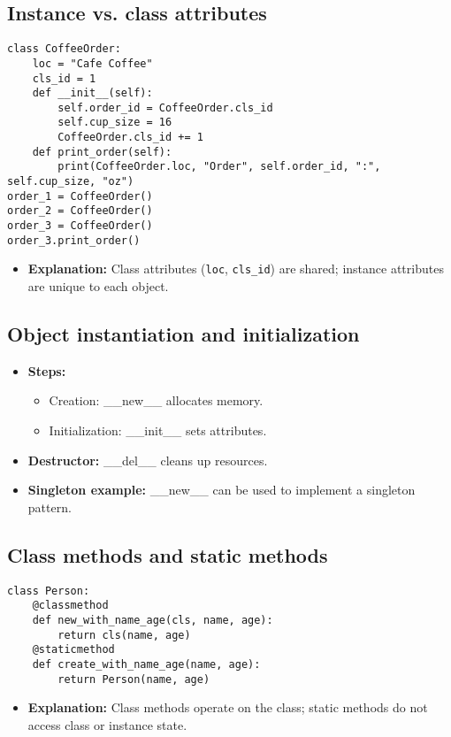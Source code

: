 \documentclass[11pt,a4paper]{article}
\begin{document}
\subsection*{Instance vs. class attributes}
\begin{verbatim}
class CoffeeOrder:
    loc = "Cafe Coffee"
    cls_id = 1
    def __init__(self):
        self.order_id = CoffeeOrder.cls_id
        self.cup_size = 16
        CoffeeOrder.cls_id += 1
    def print_order(self):
        print(CoffeeOrder.loc, "Order", self.order_id, ":", self.cup_size, "oz")
order_1 = CoffeeOrder()
order_2 = CoffeeOrder()
order_3 = CoffeeOrder()
order_3.print_order()
\end{verbatim}
\begin{itemize}
    \item \textbf{Explanation:} Class attributes (\texttt{loc}, \texttt{cls\_id}) are shared; instance attributes are unique to each object.
\end{itemize}

\subsection*{Object instantiation and initialization}
\begin{itemize}
    \item \textbf{Steps:}
        \begin{itemize}
            \item Creation: \_\_new\_\_ allocates memory.
            \item Initialization: \_\_init\_\_ sets attributes.
        \end{itemize}
    \item \textbf{Destructor:} \_\_del\_\_ cleans up resources.
    \item \textbf{Singleton example:} \_\_new\_\_ can be used to implement a singleton pattern.
\end{itemize}

\subsection*{Class methods and static methods}
\begin{verbatim}
class Person:
    @classmethod
    def new_with_name_age(cls, name, age):
        return cls(name, age)
    @staticmethod
    def create_with_name_age(name, age):
        return Person(name, age)
\end{verbatim}
\begin{itemize}
    \item \textbf{Explanation:} Class methods operate on the class; static methods do not access class or instance state.
\end{itemize}
\end{document}
